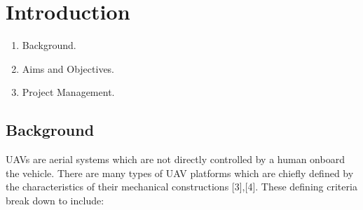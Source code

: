 \documentclass[12pt,a4paper,twoside]{report}
\begin{document}
	\newpage
	
	\tableofcontents
	
	\newpage
	
	\listoffigures
	
	\newpage
	
	\listoftables
	
	\newpage
	
	
	\chapter{Introduction}
		
		\begin{enumerate}
			\item
				Background.
			\item 
				Aims and Objectives. 
			\item 
				Project Management.
		\end{enumerate}

		\section{Background}
		
			UAVs are aerial systems which are not directly controlled by a human onboard the vehicle. There are many types of UAV platforms which are chiefly defined by the characteristics of their mechanical constructions [3],[4]. These defining criteria break down to include:
			
\end{document}
